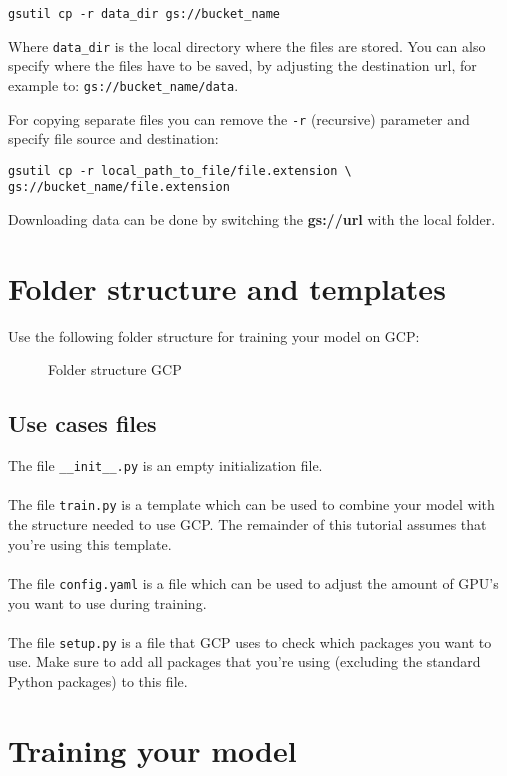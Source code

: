 \documentclass{article}
\begin{document}
\begin{verbatim}
gsutil cp -r data_dir gs://bucket_name
\end{verbatim}

Where \texttt{data\_dir} is the local directory where the files are stored. You can also specify where the files have to be saved, by adjusting the destination url, for example to: \texttt{gs://bucket\_name/data}.

For copying separate files you can remove the \texttt{-r} (recursive) parameter and specify file source and destination:
\begin{verbatim}
gsutil cp -r local_path_to_file/file.extension \
gs://bucket_name/file.extension
\end{verbatim}

Downloading data can be done by switching the \textbf{gs://url} with the local folder.

\section{Folder structure and templates}
Use the following folder structure for training your model on GCP:
\begin{figure}[H]
\caption{Folder structure GCP}
\label{fig:fsgcp}
\end{figure}
\subsection{Use cases files}
The file \texttt{\_\_init\_\_.py} is an empty initialization file.
\\
\\
The file \texttt{train.py} is a template which can be used to combine your model with the structure needed to use GCP. The remainder of this tutorial assumes that you're using this template.
\\
\\
The file \texttt{config.yaml} is a file which can be used to adjust the amount of GPU's you want to use during training. 
\\
\\
The file \texttt{setup.py} is a file that GCP uses to check which packages you want to use. Make sure to add all packages that you're using (excluding the standard Python packages) to this file.

\section{Training your model}
\end{document}
